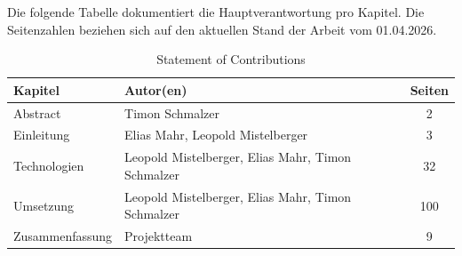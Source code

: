 Die folgende Tabelle dokumentiert die Hauptverantwortung pro Kapitel. Die Seitenzahlen beziehen sich auf den aktuellen Stand der Arbeit vom 01.04.2026.

\begin{table}[H]
    \centering
    \begin{tabularx}{\textwidth}{@{}l X c@{}}
        \toprule
        \textbf{Kapitel} & \textbf{Autor(en)} & \textbf{Seiten} \\
        \midrule
        Abstract & Timon Schmalzer & 2 \\
        Einleitung & Elias Mahr, Leopold Mistelberger & 3 \\
        Technologien & Leopold Mistelberger, Elias Mahr, Timon Schmalzer & 32 \\
        Umsetzung & Leopold Mistelberger, Elias Mahr, Timon Schmalzer & 100 \\
        Zusammenfassung & Projektteam & 9 \\
        \bottomrule
    \end{tabularx}
    \caption{Statement of Contributions}
    \label{tab:statement-of-contributions}
\end{table}
